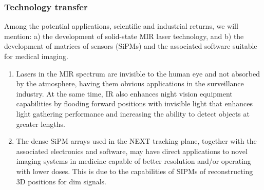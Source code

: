 \subsubsection{Technology transfer}

Among the potential applications, scientific and industrial returns, we will mention: a) the development of solid-state MIR laser technology, and b) the development of matrices of sensors (SiPMs) and the associated software suitable for medical imaging. 
\begin{enumerate}
\item Lasers in the MIR spectrum are invisible to the human eye and not absorbed by the atmosphere, having them obvious applications in the surveillance industry. At the same time, IR also enhances night vision equipment capabilities by flooding forward positions with invisible light that enhances light gathering performance and increasing the ability to detect objects at greater lengths. 
\item The dense SiPM arrays used in the NEXT tracking plane, together with the associated electronics and software, may have direct applications to novel imaging systems in medicine capable of better resolution and/or operating with lower doses. This is due to the capabilities of SIPMs of reconstructing 3D positions for dim signals. 
\end{enumerate}